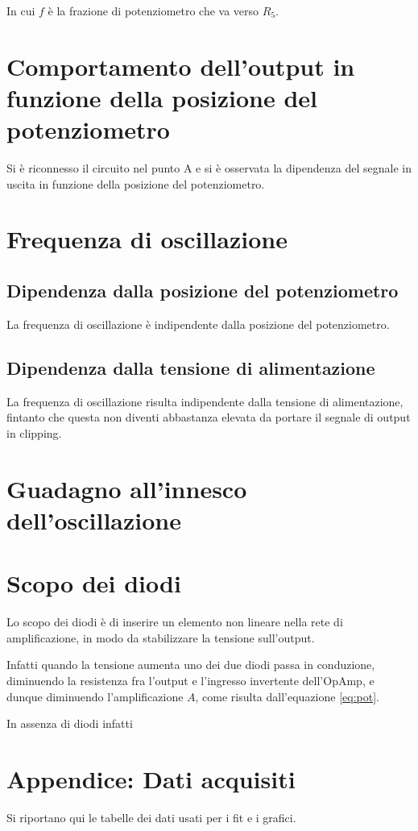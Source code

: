 \documentclass[10pt,a4paper]{article}
\begin{document}
In cui $f$ è la frazione di potenziometro che va verso $R_5$.

\section{Comportamento dell'output in funzione della posizione del potenziometro}
Si è riconnesso il circuito nel punto A e si è osservata la dipendenza del segnale in uscita in funzione della posizione del potenziometro.

\section{Frequenza di oscillazione}

\subsection{Dipendenza dalla posizione del potenziometro}
La frequenza di oscillazione è indipendente dalla posizione del potenziometro.

\subsection{Dipendenza dalla tensione di alimentazione}
La frequenza di oscillazione risulta indipendente dalla tensione di alimentazione, fintanto che questa non diventi abbastanza elevata da portare il segnale di output in clipping.

\section{Guadagno all'innesco dell'oscillazione}

\section{Scopo dei diodi}
Lo scopo dei diodi è di inserire un elemento non lineare nella rete di amplificazione, in modo da stabilizzare la tensione sull'output.

Infatti quando la tensione aumenta uno dei due diodi passa in conduzione, diminuendo la resistenza fra l'output e l'ingresso invertente dell'OpAmp, e dunque diminuendo l'amplificazione $A$, come risulta dall'equazione \eqref{eq:pot}.

In assenza di diodi infatti

\pagebreak
\section{Appendice: Dati acquisiti}
Si riportano qui le tabelle dei dati usati per i fit e i grafici.
\centering
\begin{figure}[H]
	\centering
	\resizebox{0.7\textwidth}{!}{
	}
	\label{tab:loop}
\end{figure}
\end{document}
